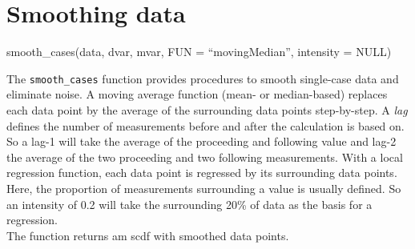 \documentclass[
  letterpaper,
  DIV=11,
  numbers=noendperiod]{scrreprt}
\newenvironment{Shaded}{\begin{snugshade}}{\end{snugshade}}
\newcommand{\AttributeTok}[1]{\textcolor[rgb]{0.40,0.45,0.13}{#1}}
\newcommand{\DocumentationTok}[1]{\textcolor[rgb]{0.37,0.37,0.37}{\textit{#1}}}
\newcommand{\FunctionTok}[1]{\textcolor[rgb]{0.28,0.35,0.67}{#1}}
\newcommand{\NormalTok}[1]{\textcolor[rgb]{0.00,0.23,0.31}{#1}}
\newcommand{\OtherTok}[1]{\textcolor[rgb]{0.00,0.23,0.31}{#1}}
\newcommand{\SpecialCharTok}[1]{\textcolor[rgb]{0.37,0.37,0.37}{#1}}
\newcommand{\StringTok}[1]{\textcolor[rgb]{0.13,0.47,0.30}{#1}}
\begin{document}
\hypertarget{smoothing-data}{%
\section{Smoothing data}\label{smoothing-data}}

\begin{tcolorbox}[enhanced jigsaw, toprule=.15mm, colframe=quarto-callout-tip-color-frame, left=2mm, colback=white, breakable, bottomrule=.15mm, arc=.35mm, rightrule=.15mm, leftrule=.75mm, opacityback=0]
\begin{minipage}[t]{5.5mm}
\textcolor{quarto-callout-tip-color}{\faLightbulb}
\end{minipage}%
\begin{minipage}[t]{\textwidth - 5.5mm}
smooth\_cases(data, dvar, mvar, FUN = ``movingMedian'', intensity =
NULL)\end{minipage}%
\end{tcolorbox}

The \texttt{smooth\_cases} function provides procedures to smooth
single-case data and eliminate noise. A moving average function (mean-
or median-based) replaces each data point by the average of the
surrounding data points step-by-step. A \emph{lag} defines the number of
measurements before and after the calculation is based on. So a lag-1
will take the average of the proceeding and following value and lag-2
the average of the two proceeding and two following measurements. With a
local regression function, each data point is regressed by its
surrounding data points. Here, the proportion of measurements
surrounding a value is usually defined. So an intensity of 0.2 will take
the surrounding 20\% of data as the basis for a regression.\\
The function returns am scdf with smoothed data points.

\begin{Shaded}
\end{Shaded}
\end{document}

